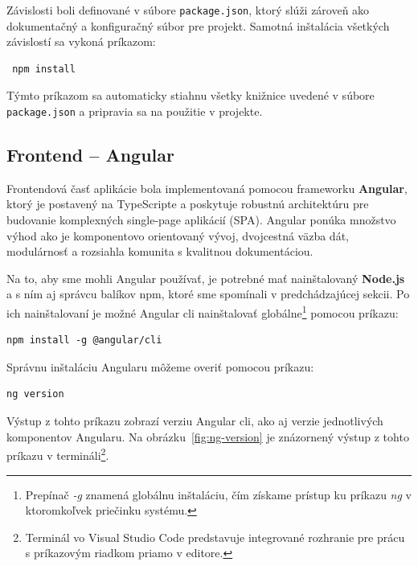  Závislosti boli definované v súbore \texttt{package.json}, ktorý slúži zároveň ako dokumentačný a konfiguračný súbor pre projekt. Samotná inštalácia všetkých závislostí sa vykoná príkazom:
 
 \begin{verbatim}
 npm install
 \end{verbatim}
 
 Týmto príkazom sa automaticky stiahnu všetky knižnice uvedené v súbore \texttt{package.json} a pripravia sa na použitie v projekte.
 
 \subsection{Frontend – Angular}

Frontendová časť aplikácie bola implementovaná pomocou frameworku \textbf{Angular}, ktorý je postavený na TypeScripte a poskytuje robustnú architektúru pre budovanie komplexných single-page aplikácií (SPA).
 Angular ponúka množstvo výhod ako je komponentovo orientovaný vývoj, dvojcestná väzba dát, modulárnosť a rozsiahla komunita s kvalitnou dokumentáciou.

\bigskip
Na to, aby sme mohli Angular používať, je potrebné mať nainštalovaný \textbf{Node.js} a s ním aj správcu balíkov \acrshort{npm}, ktoré sme spomínali v predchádzajúcej sekcii. 
Po ich nainštalovaní je možné Angular \acrshort{cli} nainštalovať globálne\footnote{Prepínač \textit{-g} znamená globálnu inštaláciu, čím získame prístup ku príkazu \textit{ng} v ktoromkoľvek priečinku systému.}
pomocou príkazu:

\begin{verbatim}
npm install -g @angular/cli
\end{verbatim}

Správnu inštaláciu Angularu môžeme overiť pomocou príkazu:

\begin{verbatim}
ng version
\end{verbatim}

Výstup z tohto príkazu zobrazí verziu Angular \acrshort{cli}, ako aj verzie jednotlivých komponentov Angularu. Na obrázku~\ref{fig:ng-version} je znázornený výstup z tohto príkazu v termináli\footnote{Terminál vo Visual Studio Code predstavuje integrované rozhranie pre prácu s príkazovým riadkom priamo v editore.}.

